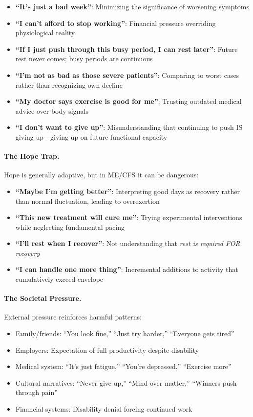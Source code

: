 \begin{itemize}
    \item \textbf{``It's just a bad week''}: Minimizing the significance of worsening symptoms
    \item \textbf{``I can't afford to stop working''}: Financial pressure overriding physiological reality
    \item \textbf{``If I just push through this busy period, I can rest later''}: Future rest never comes; busy periods are continuous
    \item \textbf{``I'm not as bad as those severe patients''}: Comparing to worst cases rather than recognizing own decline
    \item \textbf{``My doctor says exercise is good for me''}: Trusting outdated medical advice over body signals
    \item \textbf{``I don't want to give up''}: Misunderstanding that continuing to push IS giving up---giving up on future functional capacity
\end{itemize}

\paragraph{The Hope Trap.}

Hope is generally adaptive, but in ME/CFS it can be dangerous:

\begin{itemize}
    \item \textbf{``Maybe I'm getting better''}: Interpreting good days as recovery rather than normal fluctuation, leading to overexertion
    \item \textbf{``This new treatment will cure me''}: Trying experimental interventions while neglecting fundamental pacing
    \item \textbf{``I'll rest when I recover''}: Not understanding that \emph{rest is required FOR recovery}
    \item \textbf{``I can handle one more thing''}: Incremental additions to activity that cumulatively exceed envelope
\end{itemize}

\paragraph{The Societal Pressure.}

External pressure reinforces harmful patterns:

\begin{itemize}
    \item Family/friends: ``You look fine,'' ``Just try harder,'' ``Everyone gets tired''
    \item Employers: Expectation of full productivity despite disability
    \item Medical system: ``It's just fatigue,'' ``You're depressed,'' ``Exercise more''
    \item Cultural narratives: ``Never give up,'' ``Mind over matter,'' ``Winners push through pain''
    \item Financial systems: Disability denial forcing continued work
\end{itemize}

